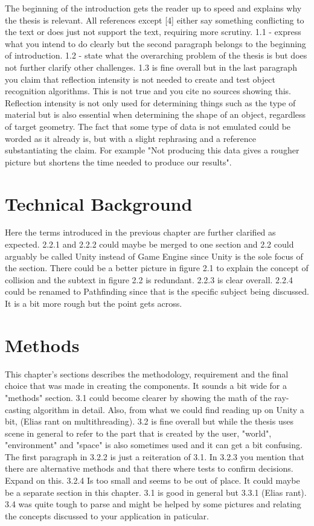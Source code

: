 \documentclass[12pt,a4paper,twoside,openright]{report}
\begin{document}
	The beginning of the introduction gets the reader up to speed and explains
	why the thesis is relevant. All references except [4] either say something
	conflicting to the text or does just not support the text, requiring more 
	scrutiny. 1.1 - express what you intend to do clearly but the second 
	paragraph belongs to the beginning of introduction. 1.2 - state what the
	overarching problem of the thesis is but does not further clarify other
	challenges. 1.3 is fine overall but in the last paragraph you claim that
	reflection intensity is not needed	to create and test object recognition
	algorithms. This is not true and you cite no sources showing this.
	Reflection intensity is not only used for determining things such as the
	type of material but is also essential when determining the shape of an
	object, regardless of target geometry. The fact that some type of data is
	not emulated could be worded as it already is, but with a slight rephrasing
	and a reference substantiating the claim. For example "Not producing this
	data gives a rougher picture but shortens the time needed to produce our
	results".

\section*{Technical Background}

	Here the terms introduced in the previous chapter are further clarified as
	expected. 2.2.1 and 2.2.2 could maybe be merged to one section and 2.2
	could arguably be called Unity instead of Game Engine since Unity is the
	sole focus of the section. There could be a better picture in figure 2.1 to
	explain the concept of collision and the subtext in figure 2.2 is
	redundant. 2.2.3 is clear overall. 2.2.4 could be renamed to Pathfinding
	since that is the specific subject being discussed. It is a bit more rough
	but the point gets across.

\section*{Methods}

	This chapter's sections describes the methodology, requirement and the
	final choice that was made in creating the components. It sounds a bit wide
	for a "methods" section. 3.1 could become clearer by showing the math of
	the ray-casting algorithm in detail. Also, from what we could find reading
	up on Unity a bit, (Elias rant on multithreading). 3.2 is fine overall but
	while the thesis uses scene in general to refer to the part that is created
	by the user, "world", "environment" and "space" is also sometimes used and
	it can get a bit confusing. The first paragraph in 3.2.2 is just a
	reiteration of 3.1. In 3.2.3 you mention that there are alternative methods
	and that there where tests to confirm decisions. Expand on this. 3.2.4 Is
	too small and seems to be out of place. It could maybe be a separate
	section in this chapter. 3.1 is good in general but 3.3.1 (Elias rant). 3.4
	was quite tough to parse and might be helped by some pictures and relating
	the concepts discussed to your application in paticular.
\end{document}
